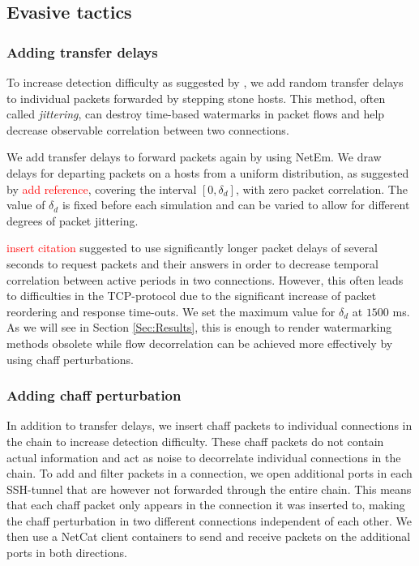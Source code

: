\documentclass[runningheads]{llncs}\usepackage[]{graphicx}\usepackage[]{color}
\begin{document}


\subsection{Evasive tactics}
\subsubsection{Adding transfer delays}\label{Sec:delays_desc}

To increase detection difficulty as suggested by  \cite{padhye2010evading}, we add random transfer delays to individual packets forwarded by stepping stone hosts. This method, often called \textit{jittering}, can destroy time-based watermarks in packet flows and help decrease observable correlation between two connections. 

We add transfer delays to forward packets again by using NetEm. We draw delays for departing packets on a hosts from a uniform distribution, as suggested by \textcolor{red}{add reference}, covering the interval $[0,\delta_d]$, with zero packet correlation. The value of $\delta_d$ is fixed before each simulation and can be varied to allow for different degrees of packet jittering. 

\textcolor{red}{insert citation} suggested to use significantly longer packet delays of several seconds to request packets and their answers in order to decrease temporal correlation between active periods in two connections. However, this often leads to difficulties in the TCP-protocol due to the significant increase of packet reordering and response time-outs. We set the maximum value for  $\delta_d$  at $1500$ ms. As we will see in Section \ref{Sec:Results}, this is enough to render watermarking methods obsolete while flow decorrelation can be achieved more effectively by using chaff perturbations. 



\subsubsection{Adding chaff perturbation}\label{Sec:chaff_desc}

In addition to transfer delays, we insert chaff packets to individual connections in the chain to increase detection difficulty. These chaff packets do not contain actual information and act as noise to decorrelate individual connections in the chain. To add and filter packets in a connection, we open additional ports in each SSH-tunnel that are however not forwarded through the entire chain. This means that each chaff packet only appears in the connection it was inserted to, making the chaff perturbation in two different connections independent of each other. 
We then use a NetCat client containers to send and receive packets on the additional ports in both directions. %
\end{document}
